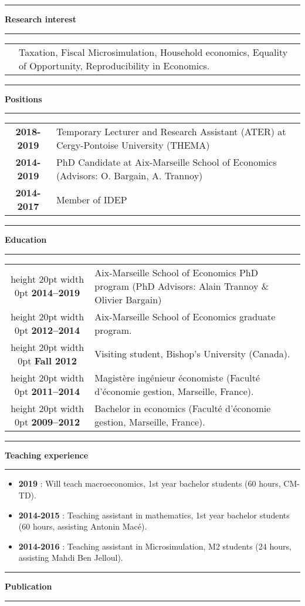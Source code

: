 \documentclass[a4paper,11pt]{article} %
\newcommand\espace{\vrule height 20pt width 0pt}
\newcommand{\titre}[1]{%
	\begin{center}
	\rule{\textwidth}{1pt}
	\par\vspace{0.1cm}
        \textbf{\large #1}
	\par\rule{\textwidth}{1pt}
	\end{center}
	}
\begin{document}
\titre{Research interest}

\begin{tabular}{c@{}p{}}

&Taxation, Fiscal Microsimulation, Household economics, Equality of Opportunity, Reproducibility in Economics.
%  
\end{tabular}

\titre{Positions}

\begin{tabular}{c@{:  }p{}}
\textbf{2018-2019} & Temporary Lecturer and Research Assistant (ATER) at Cergy-Pontoise University (THEMA) \\
 \textbf{2014-2019} & PhD Candidate at Aix-Marseille School of Economics (Advisors: O. Bargain, A. Trannoy) \\
  \textbf{2014-2017} & Member of IDEP\\
  
\end{tabular}
\titre{Education}

\begin{tabular}{c@{:  }p{}}


\espace
\textbf{2014--2019 } & Aix-Marseille School of Economics PhD program (PhD Advisors: Alain Trannoy \& Olivier Bargain) \\


\espace
\textbf{2012--2014} & Aix-Marseille School of Economics graduate program.  \\

\espace
\textbf{Fall 2012} & Visiting student, Bishop's University (Canada). \\

\espace
\textbf{2011--2014} & Magistère ingénieur économiste  (Faculté d'économie gestion, Marseille, France). \\

\espace
\textbf{2009--2012} & Bachelor in economics (Faculté d'économie gestion, Marseille, France). \\


\end{tabular}
\titre{Teaching experience}
\begin{itemize}
\item \textbf{2019} : Will teach macroeconomics, 1st year bachelor students (60 hours, CM-TD).
\item \textbf{2014-2015} : Teaching assistant in mathematics, 1st year bachelor students (60 hours, assisting Antonin Macé).
\item \textbf{2014-2016} : Teaching assistant in Microsimulation, M2 students (24 hours, assisting Mahdi Ben Jelloul).

\end{itemize}
\newpage
\titre{Publication}
\end{document}
